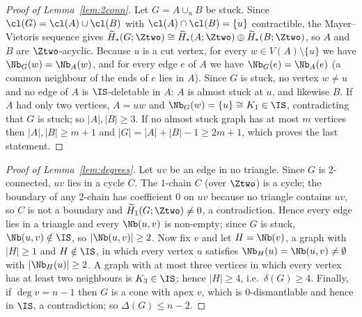 \begin{proof}[Proof of Lemma~\ref{lem:2conn}]
Let $G=A\cup_u B$ be stuck. Since $\cl(G)=\cl(A)\cup\cl(B)$ with $\cl(A)\cap\cl(B)=\{u\}$ contractible, the Mayer--Vietoris sequence gives $\widetilde H_*(G;\Ztwo)\cong\widetilde H_*(A;\Ztwo)\oplus\widetilde H_*(B;\Ztwo)$, so $A$ and $B$ are $\Ztwo$-acyclic. Because $u$ is a cut vertex, for every $w\in V(A)\setminus\{u\}$ we have $\Nb_G(w)=\Nb_A(w)$, and for every edge $e$ of $A$ we have $\Nb_G(e)=\Nb_A(e)$ (a common neighbour of the ends of $e$ lies in $A$). Since $G$ is stuck, no vertex $w\ne u$ and no edge of $A$ is $\IS$-deletable in $A$: $A$ is almost stuck at $u$, and likewise $B$. If $A$ had only two vertices, $A=uw$ and $\Nb_G(w)=\{u\}\cong K_1\in\IS$, contradicting that $G$ is stuck; so $|A|,|B|\ge 3$. If no almost stuck graph has at most $m$ vertices then $|A|,|B|\ge m+1$ and $|G|=|A|+|B|-1\ge 2m+1$, which proves the last statement.
\end{proof}

\begin{proof}[Proof of Lemma~\ref{lem:degrees}]
Let $uv$ be an edge in no triangle. Since $G$ is $2$-connected, $uv$ lies in a cycle $C$. The $1$-chain $C$ (over $\Ztwo$) is a cycle; the boundary of any $2$-chain has coefficient $0$ on $uv$ because no triangle contains $uv$, so $C$ is not a boundary and $\widetilde H_1(G;\Ztwo)\ne 0$, a contradiction. Hence every edge lies in a triangle and every $\Nb(u,v)$ is non-empty; since $G$ is stuck, $\Nb(u,v)\notin\IS$, so $|\Nb(u,v)|\ge 2$. Now fix $v$ and let $H=\Nb(v)$, a graph with $|H|\ge 1$ and $H\notin\IS$, in which every vertex $u$ satisfies $\Nb_H(u)=\Nb(u,v)\neq\emptyset$ with $|\Nb_H(u)|\ge 2$. A graph with at most three vertices in which every vertex has at least two neighbours is $K_3\in\IS$; hence $|H|\ge 4$, i.e.\ $\delta(G)\ge 4$. Finally, if $\deg v=n-1$ then $G$ is a cone with apex $v$, which is $0$-dismantlable and hence in $\IS$, a contradiction; so $\Delta(G)\le n-2$.
\end{proof}
